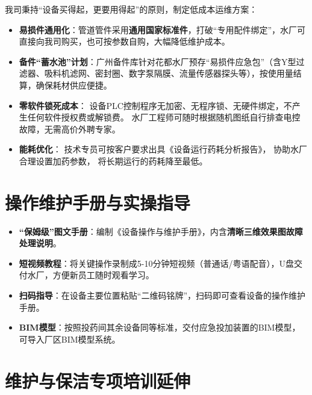 我司秉持“设备买得起，更要用得起”的原则，制定低成本运维方案：
\begin{itemize}
    \item \textbf{易损件通用化}：管道管件采用\textbf{通用国家标准件}，打破“专用配件绑定”，水厂可直接向我司购买，也可按参数自购，大幅降低维护成本。
    \item \textbf{备件“蓄水池”计划}：广州备件库针对花都水厂预存“易损件应急包”（含Y型过滤器、吸料机滤网、密封圈、数字泵隔膜、流量传感器探头等），按使用量结算，确保耗材供应便捷。
    \item \textbf{零软件锁死成本}：
        设备PLC控制程序无加密、无程序锁、无硬件绑定，不产生任何软件授权费或解锁费。
        水厂工程师可随时根据随机图纸自行排查电控故障，无需高价外聘专家。
    \item \textbf{能耗优化}：
        技术专员可按客户要求出具《设备运行药耗分析报告》，
        协助水厂合理设置加药参数，
        将长期运行的药耗降至最低。
\end{itemize}

\section{操作维护手册与实操指导}

\begin{itemize}
    \item \textbf{“保姆级”图文手册}：编制《设备操作与维护手册》，内含\textbf{清晰三维效果图故障处理说明}。
    \item \textbf{短视频教程}：将关键操作录制成5-10分钟短视频（普通话/粤语配音），U盘交付水厂，方便新员工随时观看学习。
    \item \textbf{扫码指导}：在设备主要位置粘贴“二维码铭牌”，扫码即可查看设备的操作维护手册。
    \item \textbf{BIM模型}：按照投药间其余设备同等标准，交付应急投加装置的BIM模型，可导入厂区BIM模型系统。
\end{itemize}

\section{维护与保洁专项培训延伸}

